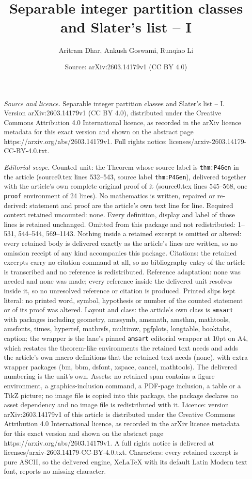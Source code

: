 \documentclass[10pt,a4paper]{amsart}
\title[Separable integer partition classes and Slater's list -- I]{Separable integer partition classes and Slater's list -- I}
\author{Aritram Dhar, Ankush Goswami, Runqiao Li}
\date{Source: arXiv:2603.14179v1 (CC BY 4.0)}
\begin{document}
\maketitle

\noindent\emph{Source and licence.} Separable integer partition classes and Slater's list -- I. Version arXiv:2603.14179v1 (CC BY 4.0), distributed under the Creative Commons Attribution 4.0 International licence, as recorded in the arXiv licence metadata for this exact version and shown on the abstract page https://arxiv.org/abs/2603.14179v1. Full rights notice: licenses/arxiv-2603.14179-CC-BY-4.0.txt.\par\smallskip

\noindent\textit{Editorial scope.} Counted unit: the Theorem whose source label is \texttt{thm:P4Gen} in the article (source0.tex lines 532--543, source label \texttt{thm:P4Gen}), delivered together with the article's own complete original proof of it (source0.tex lines 545--568, one \texttt{proof} environment of 24 lines). No mathematics is written, repaired or re-derived: statement and proof are the article's own text line for line. Required context retained uncounted: none. Every definition, display and label of those lines is retained unchanged. Omitted from this package and not redistributed: 1--531, 544--544, 569--1143. Nothing inside a retained excerpt is omitted or altered: every retained body is delivered exactly as the article's lines are written, so no omission receipt of any kind accompanies this package. Citations: the retained excerpts carry no citation command at all, so no bibliography entry of the article is transcribed and no reference is redistributed. Reference adaptation: none was needed and none was made; every reference inside the delivered unit resolves inside it, so no unresolved reference or citation is produced. Printed slips kept literal: no printed word, symbol, hypothesis or number of the counted statement or of its proof was altered. Layout and class: the article's own class is \texttt{amsart} with packages including geometry, amssymb, amsmath, amsthm, mathtools, amsfonts, times, hyperref, mathrsfs, multirow, pgfplots, longtable, booktabs, caption; the wrapper is the lane's pinned \texttt{amsart} editorial wrapper at 10pt on A4, which restates the theorem-like environments the retained text needs and adds the article's own macro definitions that the retained text needs (none), with extra wrapper packages (bm, bbm, dsfont, xspace, cancel, mathtools). The delivered numbering is the unit's own. Assets: no retained span contains a figure environment, a graphics-inclusion command, a PDF-page inclusion, a table or a TikZ picture; no image file is copied into this package, the package declares no asset dependency and no image file is redistributed with it. Licence: version arXiv:2603.14179v1 of this article is distributed under the Creative Commons Attribution 4.0 International licence, as recorded in the arXiv licence metadata for this exact version and shown on the abstract page https://arxiv.org/abs/2603.14179v1. A full rights notice is delivered at licenses/arxiv-2603.14179-CC-BY-4.0.txt. Characters: every retained excerpt is pure ASCII, so the delivered engine, XeLaTeX with its default Latin Modern text font, reports no missing character.
\end{document}
